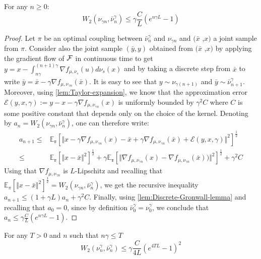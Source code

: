 \begin{lemma}\label{lem:euler_error_1}
For any $n\geq0$:
\[
W_{2}(\nu_{\gamma n},\bar{\nu}_{n}^{\gamma})\le\gamma\frac{C}{L}(e^{n\gamma L}-1)
\]
\end{lemma}
\begin{proof}
Let $\pi$ be an optimal coupling between $\bar{\nu}_{n}^{\gamma}$
and $\nu_{\gamma n}$ and  $(\bar{x}$ ,$x)$ a joint sample
from $\pi$. Consider also the joint sample $(\bar{y},y)$ obtained from  $(\bar{x}$ ,$x)$ by applying the gradient flow of ${{\mathcal F}}$ in continuous time to get $y=x-\int_{n\gamma}^{(n+1)\gamma}\nabla f_{\mu,\nu_{s}}(u)d\nu_{s}(x)$ and by taking a discrete step from $\bar{x}$ to write $\bar{y}=\bar{x}-\gamma\nabla f_{\mu,\nu_{\gamma n}}(\bar{x})$. It is easy to see that $y\sim\nu_{\gamma(n+1)}$ and $\bar{y}\sim\bar{\nu}_{n+1}^{\gamma}$.
Moreover, using \cref{lem:Taylor-expansion}, we know that the approximation error $\mathcal{E}(y,x,\gamma):=y-x-\gamma\nabla f_{\mu,\nu_{\gamma n}}(x)$ is uniformly bounded by $\gamma^{2}C$ where $C$ is some positive constant that depends only on the choice of the kernel. Denoting by $a_{n}=W_{2}(\nu_{\gamma n},\bar{\nu}_{n}^{\gamma})$, one can therefore write:
\begin{align*}
a_{n+1}\leq & \mathbb{E_{\pi}}\left[\Vert x-\gamma\nabla f_{\mu,\nu_{\gamma n}}(x)-\bar{x}+\gamma\nabla f_{\mu,\nu_{\gamma n}}(\bar{x})+\mathcal{E}(y,x,\gamma)\Vert^{2}\right]^{\frac{1}{2}}\\
\leq & \mathbb{E_{\pi}}\left[\Vert x-\bar{x}\Vert^{2}\right]^{\frac{1}{2}}+\gamma\mathbb{E_{\pi}}\left[\Vert\nabla f_{\mu,\nu_{\gamma n}}(x)-\nabla f_{\mu,\nu_{\gamma n}}(\bar{x}))\Vert^{2}\right]^{\frac{1}{2}}+\gamma^{2}C
\end{align*}
Using that $\nabla f_{\mu,\nu_{\gamma n}}$ is $L$-Lipschitz and
recalling that $\mathbb{E}_{\pi}\left[\Vert x-\bar{x}\Vert^{2}\right]^{\frac{1}{2}}=W_{2}(\nu_{\gamma n},\bar{\nu}_{n}^{\gamma})$, we get the recursive inequality $a_{n+1}\leq(1+\gamma L)a_{n}+\gamma^{2}C$. Finally, 
using \cref{lem:Discrete-Gronwall-lemma} and recalling that $a_{0}=0$, since by
definition $\bar{\nu}_{0}^{\gamma}=\nu_{0}^{\gamma}$, we conclude that $a_{n}\leq\gamma\frac{C}{L}(e^{n\gamma L}-1)$.
\end{proof}
\begin{lemma}\label{lem:euler_error_2}
For any $T>0$ and $n$ such that $n\gamma\leq T$
\[
W_{2}(\nu_{n}^{\gamma},\bar{\nu}_{n}^{\gamma})\leq\gamma\frac{C}{4L}(e^{4TL}-1)^{2}
\]
\end{lemma}
